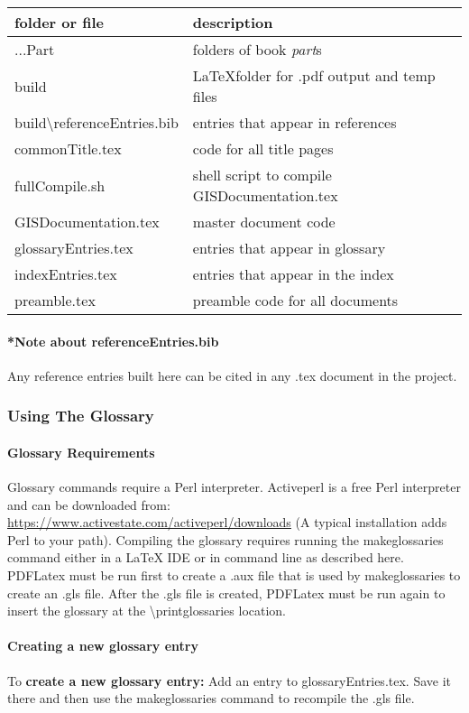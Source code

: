 \documentclass[class=book , crop=false]{standalone}
\begin{document}
\begin{adjmulticols}{1}{\innerMar}{\outerMar}
\begin{tabular}{p{6cm}| p{9cm} }
\footnotesize folder or file & {\footnotesize description }\\ \hline
...Part & folders of book \textit{part}s\\
build & \LaTeX{}folder for .pdf output and temp files \\
build\textbackslash referenceEntries.bib & entries that appear in references\\
commonTitle.tex & code for all title pages\\
fullCompile.sh & shell script to compile GISDocumentation.tex\\
GISDocumentation.tex & master document code\\
glossaryEntries.tex & entries that appear in glossary\\
indexEntries.tex & entries that appear in the index\\
preamble.tex & preamble code for all documents\\
\end{tabular}
\end{adjmulticols}
\paragraph*{*Note about referenceEntries.bib}
{\footnotesize Any reference entries built here can be cited in any .tex document in the project.}

\clearpage

\subsubsection[Using The Glossary]{{\Large Using The Glossary}}
\paragraph{Glossary Requirements}
Glossary commands require a Perl interpreter.  Activeperl is a free Perl interpreter and can be downloaded from:\\ \href{https://www.activestate.com/activeperl/downloads}{https://www.activestate.com/activeperl/downloads}
{\tiny (A typical installation adds Perl to your path)}.  Compiling the glossary requires running the makeglossaries command either in a \LaTeX{} IDE or in command line as described here.  PDFLatex must be run first to create a .aux file that is used by makeglossaries to create an .gls file.  After the .gls file is created, PDFLatex must be run again to insert the glossary at the \textbackslash printglossaries location.
\paragraph{Creating a new glossary entry}
To \textbf{create a new glossary entry:} Add an entry to glossaryEntries.tex.  Save it there and then use the makeglossaries command to recompile the .gls file.
\end{document}
